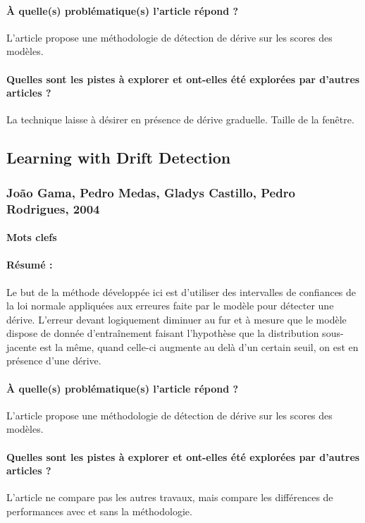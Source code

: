 \documentclass[11pt,a4paper]{report}
\begin{document}
\paragraph{À quelle(s) problématique(s) l'article répond ?} L'article propose une méthodologie de détection de dérive sur les scores des modèles.

\paragraph{Quelles sont les pistes à explorer et ont-elles été explorées par d'autres articles ?} La technique laisse à désirer en présence de dérive graduelle. Taille de la fenêtre.





\subsection{Learning with Drift Detection}
\subsubsection{João Gama, Pedro Medas, Gladys Castillo, Pedro Rodrigues, 2004}

\paragraph{Mots clefs}

\paragraph{Résumé :} Le but de la méthode développée ici est d'utiliser des intervalles de confiances de la loi normale appliquées aux erreures faite par le modèle pour détecter une dérive. L'erreur devant logiquement diminuer au fur et à mesure que le modèle dispose de donnée d'entraînement faisant l'hypothèse que la distribution sous-jacente est la même, quand celle-ci augmente au delà d'un certain seuil, on est en présence d'une dérive.

\paragraph{À quelle(s) problématique(s) l'article répond ?} L'article propose une méthodologie de détection de dérive sur les scores des modèles.

\paragraph{Quelles sont les pistes à explorer et ont-elles  été explorées par d'autres articles ?} L'article ne compare pas les autres travaux, mais compare les différences de performances avec et sans la méthodologie.
\end{document}
